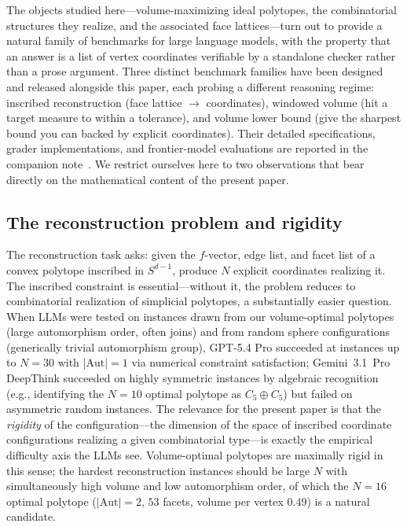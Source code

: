 \documentclass[11pt]{article}
\begin{document}
The objects studied here---volume-maximizing ideal polytopes, the
combinatorial structures they realize, and the associated face
lattices---turn out to provide a natural family of benchmarks for
large language models, with the property that an answer is a list of
vertex coordinates verifiable by a standalone checker rather than a
prose argument.  Three distinct benchmark families have been
designed and released alongside this paper, each probing a different
reasoning regime: inscribed reconstruction (face lattice
$\to$ coordinates), windowed volume (hit a target measure to within a
tolerance), and volume lower bound (give the sharpest bound you can
backed by explicit coordinates).  Their detailed specifications,
grader implementations, and frontier-model evaluations are reported
in the companion note~\cite{LLMNote}.  We restrict ourselves here to
two observations that bear directly on the mathematical content of
the present paper.

\subsection{The reconstruction problem and rigidity}

The reconstruction task asks: given the $f$-vector, edge list, and
facet list of a convex polytope inscribed in $S^{d-1}$, produce
$N$ explicit coordinates realizing it.  The inscribed constraint
is essential---without it, the problem reduces to combinatorial
realization of simplicial polytopes, a substantially easier
question.  When LLMs were tested on instances drawn from our
volume-optimal polytopes (large automorphism order, often joins) and
from random sphere configurations (generically trivial automorphism
group), GPT-5.4 Pro succeeded at instances up to $N = 30$ with
$|\mathrm{Aut}| = 1$ via numerical constraint satisfaction;
Gemini~3.1~Pro DeepThink succeeded on highly symmetric instances by
algebraic recognition (e.g., identifying the $N = 10$ optimal
polytope as $C_5 \oplus C_5$) but failed on asymmetric random
instances.  The relevance for the present paper is that the
\emph{rigidity} of the configuration---the dimension of the space
of inscribed coordinate configurations realizing a given
combinatorial type---is exactly the empirical difficulty axis the
LLMs see.  Volume-optimal polytopes are maximally rigid in this
sense; the hardest reconstruction instances should be large $N$
with simultaneously high volume and low automorphism order, of
which the $N = 16$ optimal polytope ($|\mathrm{Aut}| = 2$, $53$
facets, volume per vertex $0.49$) is a natural candidate.
\end{document}
